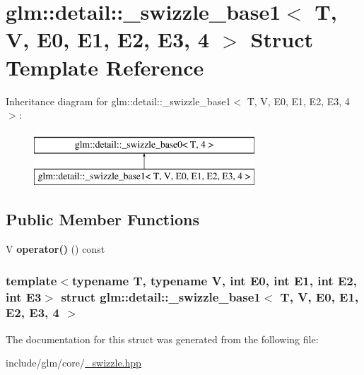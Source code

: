 \hypertarget{structglm_1_1detail_1_1__swizzle__base1_3_01T_00_01V_00_01E0_00_01E1_00_01E2_00_01E3_00_014_01_4}{\section{glm\-:\-:detail\-:\-:\-\_\-swizzle\-\_\-base1$<$ \-T, \-V, \-E0, \-E1, \-E2, \-E3, 4 $>$ \-Struct \-Template \-Reference}
\label{structglm_1_1detail_1_1__swizzle__base1_3_01T_00_01V_00_01E0_00_01E1_00_01E2_00_01E3_00_014_01_4}
}
\-Inheritance diagram for glm\-:\-:detail\-:\-:\-\_\-swizzle\-\_\-base1$<$ \-T, \-V, \-E0, \-E1, \-E2, \-E3, 4 $>$\-:\begin{figure}[H]
\begin{center}
\leavevmode
\includegraphics[height=2.000000cm]{structglm_1_1detail_1_1__swizzle__base1_3_01T_00_01V_00_01E0_00_01E1_00_01E2_00_01E3_00_014_01_4}
\end{center}
\end{figure}
\subsection*{\-Public \-Member \-Functions}
\begin{DoxyCompactItemize}
\item 
\hypertarget{structglm_1_1detail_1_1__swizzle__base1_3_01T_00_01V_00_01E0_00_01E1_00_01E2_00_01E3_00_014_01_4_acca1ce42f230b5adba6b01b77af5f61a}{\-V {\bfseries operator()} () const }\label{structglm_1_1detail_1_1__swizzle__base1_3_01T_00_01V_00_01E0_00_01E1_00_01E2_00_01E3_00_014_01_4_acca1ce42f230b5adba6b01b77af5f61a}

\end{DoxyCompactItemize}
\subsubsection*{template$<$typename T, typename V, int \-E0, int \-E1, int \-E2, int \-E3$>$ struct glm\-::detail\-::\-\_\-swizzle\-\_\-base1$<$ T, V, E0, E1, E2, E3, 4 $>$}



\-The documentation for this struct was generated from the following file\-:\begin{DoxyCompactItemize}
\item 
include/glm/core/\hyperlink{__swizzle_8hpp}{\-\_\-swizzle.\-hpp}\end{DoxyCompactItemize}
